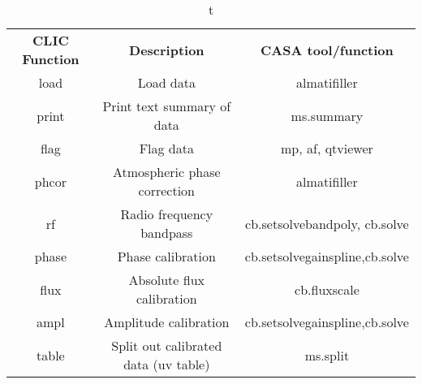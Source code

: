 \vspace{5mm}
\begin{table}[h!]
\caption[t]
        {\label{table:clic}t}
\begin{center}
\begin{tabular}{|c|c|c|} \hline
{\bf CLIC Function}  & {\bf Description}           &   {\bf CASA tool/function}  \\
  load              & Load data                    &  almatifiller  \\
  print             & Print text summary of data   &  ms.summary \\ 
  flag              & Flag data                    &  mp, af, qtviewer  \\
  phcor             & Atmospheric phase correction &  almatifiller \\  
  rf                & Radio frequency bandpass     &   cb.setsolvebandpoly, cb.solve  \\
  phase             & Phase calibration            &   cb.setsolvegainspline,cb.solve  \\
  flux              & Absolute flux calibration    &   cb.fluxscale  \\
  ampl              & Amplitude calibration        &   cb.setsolvegainspline,cb.solve  \\
  table             & Split out calibrated data (uv table)  &   ms.split   \\
\hline
\end{tabular}
\end{center}
\end{table}


